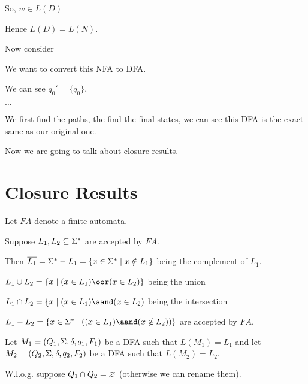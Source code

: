 \documentclass[11pt, cyan, night, 0.5in]{LatexTemplate/hw}
\begin{document}
So, $w\in L(D)$ 


Hence $L(D)=L(N)$.

Now consider 

We want to convert this NFA to DFA.

We can see $q_0'=\{q_0\}$,

$\dots$


We first find the paths, the find the final states, we can see this DFA is the exact same as our original one.

Now we are going to talk about closure results.

\section{Closure Results}

Let $FA$ denote a finite automata.

Suppose $L_1,L_2\subseteq\Sigma^*$ are accepted by $FA$.

Then $\overline{L_1}=\Sigma^*-L_1=\{x\in\Sigma^*\mid x\notin L_1\}$ being the complement of $L_1$.

$L_1\cup L_2=\{x\mid (x\in L_1)\oor (x\in L_2)\}$ being the union

$L_1\cap L_2=\{x\mid (x\in L_1) \aand (x\in L_2)$ being the intersection

$L_1-L_2=\{x\in\Si^*\mid ((x\in L_1)\aand (x\notin L_2))\}$ are accepted by $FA$.


Let $M_1=(Q_1,\Sigma,\delta,q_1,F_1)$ be a DFA such that $L(M_1)=L_1$ and let $M_2=(Q_2,\Sigma,\delta,q_2,F_2)$ be a DFA such that $L(M_2)=L_2$.

W.l.o.g. suppose $Q_1\cap Q_2=\varnothing$ (otherwise we can rename them).
\end{document}
